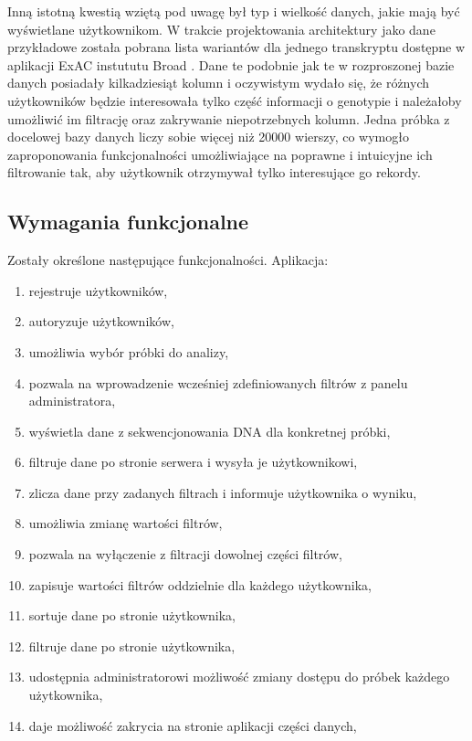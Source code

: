 \documentclass[a4paper,12pt,twoside]{article}
\begin{document}
Inną istotną kwestią wziętą pod uwagę był typ i wielkość danych, jakie mają być wyświetlane użytkownikom.
W trakcie projektowania architektury jako dane przykładowe została pobrana lista wariantów dla jednego transkryptu dostępne w aplikacji ExAC instututu Broad \cite{exac} \cite{exacCite}. Dane te
podobnie jak te w rozproszonej bazie danych posiadały kilkadziesiąt kolumn i oczywistym wydało się, że różnych użytkowników będzie interesowała tylko część informacji o genotypie i należałoby umożliwić im filtrację oraz zakrywanie niepotrzebnych kolumn.
Jedna próbka z docelowej bazy danych liczy sobie więcej niż 20000 wierszy, co wymogło zaproponowania
funkcjonalności umożliwiające na poprawne i intuicyjne ich filtrowanie
tak, aby użytkownik otrzymywał tylko interesujące go rekordy.

\subsection{Wymagania funkcjonalne}
Zostały określone następujące funkcjonalności. Aplikacja:

\begin{enumerate}[1)]
\item rejestruje użytkowników,
\item autoryzuje użytkowników,
\item umożliwia wybór próbki do analizy,
\item pozwala na wprowadzenie wcześniej zdefiniowanych filtrów z panelu administratora,
\item wyświetla dane z sekwencjonowania DNA dla konkretnej próbki,
\item filtruje dane po stronie serwera i wysyła je użytkownikowi,
\item zlicza dane przy zadanych filtrach i informuje użytkownika o wyniku,
\item umożliwia zmianę wartości filtrów,
\item pozwala na wyłączenie z filtracji dowolnej części filtrów,
\item zapisuje wartości filtrów oddzielnie dla każdego użytkownika,
\item sortuje dane po stronie użytkownika,
\item filtruje dane po stronie użytkownika,
\item udostępnia administratorowi możliwość zmiany dostępu do próbek
każdego użytkownika,
\item daje możliwość zakrycia na stronie aplikacji części danych,
\end{enumerate}
\end{document}
